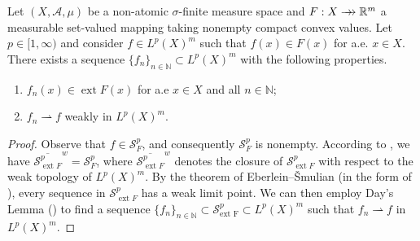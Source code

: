 \documentclass[hidelinks,onefignum,onetabnum]{siamart220329}
\newcommand{\rrightarrow}{\mathrel{\mathrlap{\rightarrow}\mkern1mu\rightarrow}}
\let\twoheadrightarrow\rrightarrow
\newcommand{\ext}{\operatorname{ext}}
\begin{document}
\begin{lemma}\label{exissequ}
	Let $(X,\mathcal A,\mu)$ be a non-atomic $\sigma$-finite measure space and $F:X\twoheadrightarrow\mathbb R^m$  a measurable set-valued mapping taking nonempty compact convex values. Let $p\in[1,\infty)$ and consider $f\in L^p(X)^m$ such that $f(x)\in F(x)$ for a.e. $x\in X$. There exists a sequence $\{f_n\}_{n\in\mathbb N}\subset L^p(X)^m$ with the following properties.
	\begin{enumerate}
		\item $f_n(x)\in \ext F(x)$ for a.e $x\in X$ and all $n\in\mathbb N$;
		
		\item $f_n\rightharpoonup f$ weakly in $L^p(X)^m$.
	\end{enumerate}
\end{lemma}
\begin{proof} 
	Observe that $f\in \mathcal S_F^p$, and consequently $\mathcal S_{F}^p$ is nonempty. According to \cite[Proposition 6.4.27]{Anhand}, we have $\overline{\mathcal S_{\ext F}^p}^{w}=\mathcal S^p_{F}$, where $\overline{\mathcal S_{\ext F}^p}^{w}$ denotes the closure of $\mathcal S_{\ext F}^p$ with respect to the weak topology of ${L^p(X)^m}$.  By the theorem of Eberlein--\v{S}mulian (in the form of \cite[Theorem 2.8.6]{Megginson}), every sequence in $\mathcal S^p_{\ext F}$ has a weak limit point.  We can then employ Day's Lemma (\cite[Lemma 2.8.5]{Megginson}) to find a sequence $\{f_n\}_{n\in\mathbb N}\subset\mathcal S_{\text{ext F}}^p \subset {L^p(X)^m}$ such that
	$f_n  \rightharpoonup f$ in $L^p(X)^m$.
\end{proof}
\end{document}
